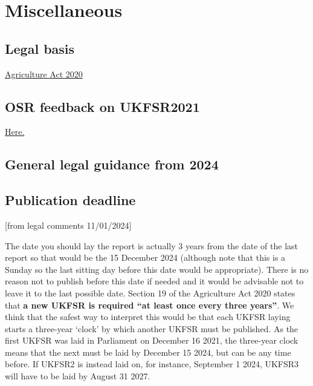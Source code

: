 \documentclass[
]{book}
\begin{document}
\hypertarget{appendix-appendix}{%
\appendix}


\hypertarget{miscellaneous}{%
\chapter{Miscellaneous}\label{miscellaneous}}

\hypertarget{legal-basis}{%
\section{Legal basis}\label{legal-basis}}

\href{https://www.legislation.gov.uk/ukpga/2020/21/part/2/chapter/1/enacted}{Agriculture Act 2020}

\hypertarget{osr-feedback-on-ukfsr2021}{%
\section{OSR feedback on UKFSR2021}\label{osr-feedback-on-ukfsr2021}}

\href{https://osr.statisticsauthority.gov.uk/correspondence/mark-pont-to-ian-lonsdale-united-kingdom-food-security-report/}{Here.}

\hypertarget{general-legal-guidance-from-2024}{%
\section{General legal guidance from 2024}\label{general-legal-guidance-from-2024}}

\hypertarget{publication-deadline}{%
\section{Publication deadline}\label{publication-deadline}}

{[}from legal comments 11/01/2024{]}

The date you should lay the report is actually 3 years from the date of the last
report so that would be the 15 December 2024 (although note that this is a
Sunday so the last sitting day before this date would be appropriate). There is
no reason not to publish before this date if needed and it would be advisable
not to leave it to the last possible date. Section 19 of the Agriculture Act
2020 states that \textbf{a new UKFSR is required ``at least once every three years''}. We
think that the safest way to interpret this would be that each UKFSR laying
starts a three-year `clock' by which another UKFSR must be published. As the
first UKFSR was laid in Parliament on December 16 2021, the three-year clock
means that the next must be laid by December 15 2024, but can be any time
before. If UKFSR2 is instead laid on, for instance, September 1 2024, UKFSR3
will have to be laid by August 31 2027.
\end{document}
